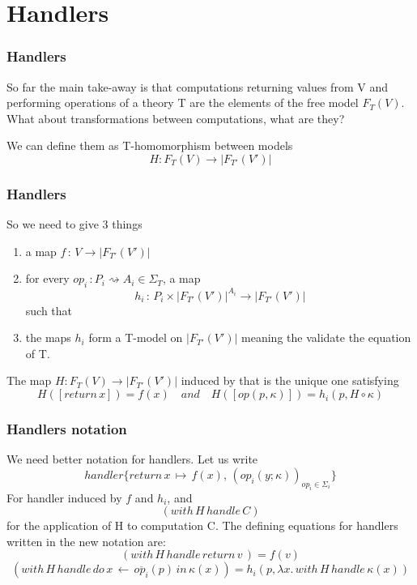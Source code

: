 \documentclass{beamer}
\begin{document}
    
    
        

\section{Handlers}

\begin{frame}
    \frametitle{Handlers}
    So far the main take-away is that computations returning values from V and performing
operations of a theory T are the elements of the free model $F_T(V)$. What about transformations between computations, what are they?
    
We can define them as T-homomorphism between models 
\[
  H : F_T(V) \rightarrow |F_{T'}(V')|
\]


    

\end{frame}
\begin{frame}
    \frametitle{Handlers}
    So we need to give 3 things 
\begin{enumerate}
    \item a map $f \, : \, V \rightarrow |F_{T'}(V')|$
    \item for every $op_i \, : P_i \rightsquigarrow A_i \in \Sigma_T$, a map 
    \[
        h_i \, : \, P_i \times |F_{T'}(V')|^{A_i} \rightarrow |F_{T'}(V')|
    \]
    such that
    \item  the maps $h_i$ form a T-model on $|F_{T'}(V')|$ meaning the validate the equation of T.
\end{enumerate}
The map $H : F_T(V) \rightarrow |F_{T'}(V')|$ induced by that is the unique one satisfying 
\[
  H([return \, x]) = f(x) \quad and \quad H([op(p,\kappa)]) = h_i(p, H \circ \kappa)  
\]

\end{frame}

\begin{frame}
    \frametitle{Handlers notation}
    We need better notation for handlers. Let us write 
    \[
      handler \{  
        return \, x \, \mapsto \, f(x), \, (op_i(y; \kappa))_{op_i \in \Sigma_i}
      \}  
    \]
    For handler induced by $f$ and $h_i$, and 
    \[
      (with \, H \, handle \, C)  
    \] for the application of H to computation C.
    The defining equations for handlers written
in the new notation are:
\[
    (with \, H \, handle \, return \,  v \,) = f(v)  
\]
\[
  (with \, H \, handle \, do\,  x \, \leftarrow \, \overline{op_i}(p) \, in \, \kappa(x) )
  = h_i (p, \lambda x. \, with \, H \, handle \, \kappa(x))  
\]



    

\end{frame}
\end{document}
